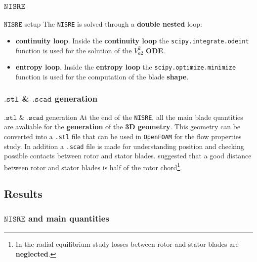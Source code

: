 \subsubsection{$\mathtt{NISRE}$}
	\begin{frame}[fragile]{$\mathtt{NISRE}$ setup}
		The \verb|NISRE| is solved through a \textbf{double nested} loop:
		\begin{itemize}
			\item \textbf{continuity loop}. Inside the \textbf{continuity loop} the \verb|scipy.integrate.odeint| function is used for the solution of the $V_{a2}^2$ \textbf{ODE}.
			\item \textbf{entropy loop}. Inside the \textbf{entropy loop} the \verb|scipy.optimize.minimize| function is used for the computation of the blade \textbf{shape}.
		\end{itemize}
	\end{frame}

\subsubsection{$\mathtt{.stl}$ \& $\mathtt{.scad}$ generation}
	\begin{frame}[fragile]{$\mathtt{.stl}$ \& $\mathtt{.scad}$ generation}
		At the end of the \verb|NISRE|, all the main blade quantities are avaliable for the \textbf{generation} of the \textbf{3D geometry}. This geometry can be converted into a \verb|.stl| file that can be used in \verb|OpenFOAM| for the flow properties study. In addition a \verb|.scad| file is made for understanding position and checking possible contacts between rotor and stator blades.	
		\newline
		\newline 
		\cite{baskharone2006principles} suggested that a good distance between rotor and stator blades is half of the rotor chord\footnote{In the radial equilibrium study losses between rotor \newline and stator blades are \textbf{neglected}.}.
	\end{frame}

\subsection{Results}
	\subsubsection{$\mathtt{NISRE}$ and main quantities}

